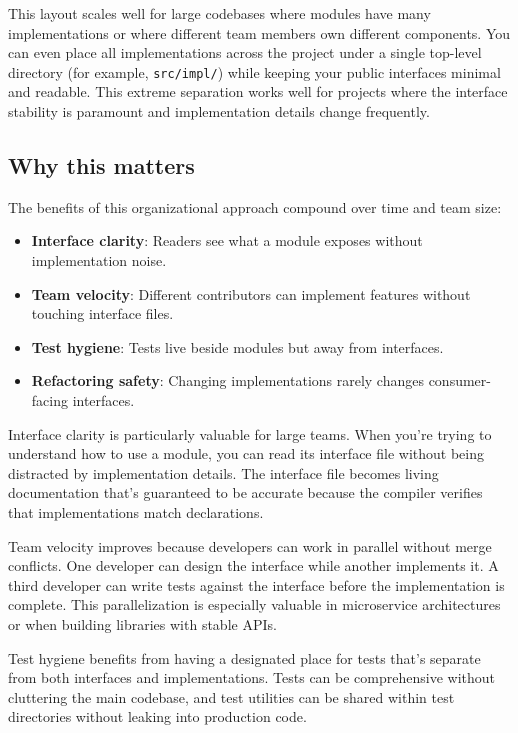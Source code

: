 This layout scales well for large codebases where modules have many implementations or where different team members own different components. You can even place all implementations across the project under a single top-level directory (for example, \texttt{src/impl/}) while keeping your public interfaces minimal and readable. This extreme separation works well for projects where the interface stability is paramount and implementation details change frequently.

\subsection*{Why this matters}

The benefits of this organizational approach compound over time and team size:

\begin{itemize}
    \item \textbf{Interface clarity}: Readers see what a module exposes without implementation noise.
    \item \textbf{Team velocity}: Different contributors can implement features without touching interface files.
    \item \textbf{Test hygiene}: Tests live beside modules but away from interfaces.
    \item \textbf{Refactoring safety}: Changing implementations rarely changes consumer-facing interfaces.
\end{itemize}

Interface clarity is particularly valuable for large teams. When you're trying to understand how to use a module, you can read its interface file without being distracted by implementation details. The interface file becomes living documentation that's guaranteed to be accurate because the compiler verifies that implementations match declarations.

Team velocity improves because developers can work in parallel without merge conflicts. One developer can design the interface while another implements it. A third developer can write tests against the interface before the implementation is complete. This parallelization is especially valuable in microservice architectures or when building libraries with stable APIs.

Test hygiene benefits from having a designated place for tests that's separate from both interfaces and implementations. Tests can be comprehensive without cluttering the main codebase, and test utilities can be shared within test directories without leaking into production code.

